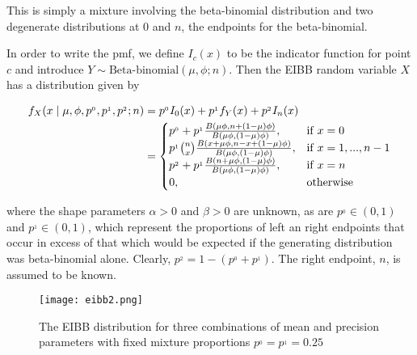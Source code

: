 This is simply a mixture involving the beta-binomial distribution and two degenerate distributions at $0$ and $n$, the endpoints for the beta-binomial.

In order to write the pmf, we define $I_c(x)$ to be the indicator function for point $c$ and introduce $Y \sim \text{Beta-binomial}(\mu, \phi; n)$. Then the EIBB random variable $X$ has a distribution given by

\begin{equation}
\begin{split}
f_{X}(x \mid \mu, \phi, p^{_0}, p^{_1}, p^{_2}; n)
&= p^{_0}I_0(x) + p^{_1} f_{Y}(x) + p^{_2}I_n(x)\\
&=	\begin{cases}
p^{_0} + p^{_1} {B(\mu\phi, n+(1-\mu)\phi) \over B(\mu\phi,(1-\mu)\phi)}, & \mathrm{if}\; x=0\\
p^{_1} {n \choose x} {B(x+\mu\phi, n-x+(1-\mu)\phi) \over B(\mu\phi,(1-\mu)\phi)}, & \mathrm{if}\; x=1,...,n-1\\
p^{_2} + p^{_1} {B(n+\mu\phi, (1-\mu)\phi) \over B(\mu\phi,(1-\mu)\phi)}, & \mathrm{if}\; x=n\\
0, & \mathrm{otherwise}
	\end{cases}
\end{split}
\label{densidad}
\end{equation}
	
\noindent where the shape parameters $\alpha > 0$ and $\beta > 0$ are unknown, as are $p^{_0} \in (0, 1)$ and $p^{_1} \in (0, 1)$, which represent the proportions of left an right endpoints that occur in excess of that which would be expected if the generating distribution was beta-binomial alone. Clearly, $p^{_2} = 1 -  (p^{_0}+p^{_1})$.  The right endpoint, $n$, is assumed to be known.\\

\begin{figure}
  \texttt{[image: eibb2.png]}
  \caption{The EIBB distribution for three combinations of mean and precision parameters with fixed mixture proportions $p^{_0} = p^{_1} = 0.25$}
  \label{fig:eibb}
\end{figure}